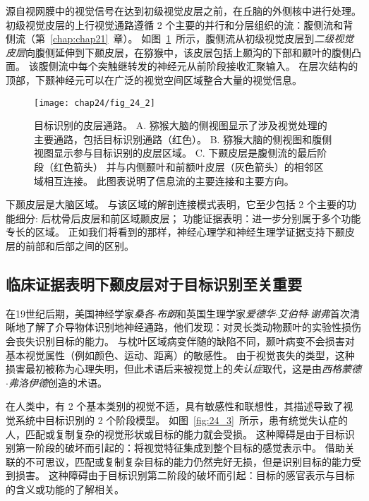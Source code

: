 源自视网膜中的视觉信号在达到初级视觉皮层之前，在丘脑的外侧核中进行处理。
初级视觉皮层的上行视觉通路遵循 2 个主要的并行和分层组织的流：腹侧流和背侧流（第~\ref{chap:chap21}~章）。
如图~\ref{fig:24_2}~所示，腹侧流从初级视觉皮层到\textit{二级视觉皮层}向腹侧延伸到下颞皮层，在猕猴中，该皮层包括上颞沟的下部和颞叶的腹侧凸面。
该腹侧流中每个突触继转发的神经元从前阶段接收汇聚输入。
在层次结构的顶部，下颞神经元可以在广泛的视觉空间区域整合大量的视觉信息。


\begin{figure}[htbp]
	\centering
	\texttt{[image: chap24/fig\_24\_2]}
	\caption{目标识别的皮层通路。
		A. 猕猴大脑的侧视图显示了涉及视觉处理的主要通路，包括目标识别通路（红色）。
		B. 猕猴大脑的侧视图和腹侧视图显示参与目标识别的皮层区域。
		C. 下颞皮层是腹侧流的最后阶段（红色箭头） 并与内侧颞叶和前额叶皮层（灰色箭头）的相邻区域相互连接。
		此图表说明了信息流的主要连接和主要方向。}
	\label{fig:24_2}
\end{figure}


下颞皮层是大脑区域。
与该区域的解剖连接模式表明，它至少包括 2 个主要的功能细分: 后枕骨后皮层和前区域颞皮层；
功能证据表明：进一步分别属于多个功能专长的区域。
正如我们将看到的那样，神经心理学和神经生理学证据支持下颞皮层的前部和后部之间的区别。



\subsection{临床证据表明下颞皮层对于目标识别至关重要}

在19世纪后期，美国神经学家\textit{桑各$\cdot$布朗}和英国生理学家\textit{爱德华$\cdot$艾伯特$\cdot$谢弗}首次清晰地了解了介导物体识别地神经通路，他们发现：对灵长类动物颞叶的实验性损伤会丧失识别目标的能力。
与枕叶区域病变伴随的缺陷不同，颞叶病变不会损害对基本视觉属性（例如颜色、运动、距离）的敏感性。
由于视觉丧失的类型，这种损害最初被称为心理失明，但此术语后来被视觉上的\textit{失认症}取代，这是由\textit{西格蒙德$\cdot$弗洛伊德}创造的术语。


在人类中，有 2 个基本类别的视觉不适，具有敏感性和联想性，其描述导致了视觉系统中目标识别的 2 个阶段模型。
如图~\ref{fig:24_3}~所示，患有统觉失认症的人，匹配或复制复杂的视觉形状或目标的能力就会受损。
这种障碍是由于目标识别第一阶段的破坏而引起的：将视觉特征集成到整个目标的感觉表示中。
借助关联的不可思议，匹配或复制复杂目标的能力仍然完好无损，但是识别目标的能力受到损害。
这种障碍由于目标识别第二阶段的破坏而引起：目标的感官表示与目标的含义或功能的了解相关。


